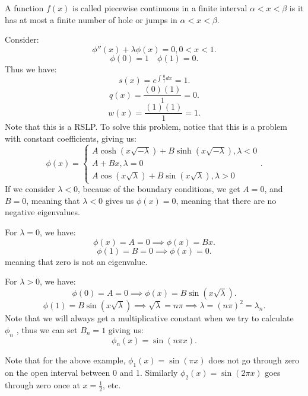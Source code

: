 \documentclass[../main/main.tex]{subfiles}
\begin{document}
\begin{definition}
	A function $f(x)$ is called piecewise continuous in a finite interval $\alpha < x <  \beta$ is it has at most a finite number of hole or jumps in $\alpha < x <\beta$.
\end{definition}
\begin{example}
	Consider: \[
		\phi''(x) + \lambda \phi(x) = 0 , 0 < x < 1
	.\] \[
	\phi(0) = 1 \quad \phi(1) = 0
	.\] Thus we have: \[
	s(x) =e^{\int \frac{0}{1}dx} = 1
	.\] \[
	q(x) = \frac{(0) (1)}{1}=0 
	.\] \[
	w(x) = \frac{(1)(1)}{1}=1
	.\] Note that this is a RSLP. To solve this problem, notice that this is a problem with constant coefficients, giving us: \[
	\phi(x) = \begin{cases}
		A \cosh(x\sqrt{-\lambda} ) + B  \sinh (x\sqrt{-\lambda} ), \lambda<0 \\
		A+Bx , \lambda = 0\\
		A \cos(x\sqrt{\lambda} ) + B\sin(x\sqrt{\lambda} ), \lambda > 0
	\end{cases}
.\] If we  consider $\lambda < 0 $, because of the boundary conditions, we get $A=0$, and $B=0$, meaning that $\lambda<0$ gives us $\phi(x) = 0$, meaning that there are no negative eigenvalues. 

For $\lambda=0$, we have: \[
	\phi(x) = A = 0 \implies \phi(x) = Bx
.\] \[
\phi(1) = B = 0 \implies \phi(x) = 0
.\] meaning that zero is not an eigenvalue. 

For $\lambda > 0$, we have: \[
	\phi(0) = A = 0 \implies \phi(x) = B\sin(x\sqrt{\lambda} )
.\] \[
\phi(1) = B\sin(x\sqrt{\lambda} ) \implies \sqrt{\lambda} =n\pi \implies \lambda = (n\pi)^2 = \lambda_n
.\] Note that we will always get a multiplicative constant when we try to calculate $\phi_n$ , thus we can set $B_n= 1$ giving us: \[
\phi_n(x) = \sin(n\pi x)
.\] 
\end{example}
\begin{remark}
	Note that for the above example, $\phi_1(x) = \sin(\pi x)$  does not go through zero on the open interval between 0 and 1. Similarly $\phi_2(x) = \sin(2\pi x)$ goes through zero once at $x=\frac{1}{2}$, etc.
\end{remark}
\end{document}
